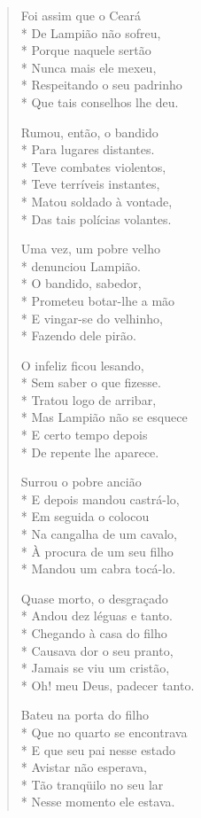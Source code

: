 \begin{verse}
Foi assim que o Ceará\\*
De Lampião não sofreu,\\*
Porque naquele sertão\\*
Nunca mais ele mexeu,\\*
Respeitando o seu padrinho\\*
Que tais conselhos lhe deu.

Rumou, então, o bandido\\*
Para lugares distantes.\\*
Teve combates violentos,\\*
Teve terríveis instantes,\\*
Matou soldado à vontade,\\*
Das tais polícias volantes.

Uma vez, um pobre velho\\*
denunciou Lampião.\\*
O bandido, sabedor,\\*
Prometeu botar-lhe a mão\\*
E vingar-se do velhinho,\\*
Fazendo dele pirão.

O infeliz ficou lesando,\\*
Sem saber o que fizesse.\\*
Tratou logo de arribar,\\*
Mas Lampião não se esquece\\*
E certo tempo depois\\*
De repente lhe aparece.

Surrou o pobre ancião\\*
E depois mandou castrá-lo,\\*
Em seguida o colocou\\*
Na cangalha de um cavalo,\\*
À procura de um seu filho\\*
Mandou um cabra tocá-lo.

Quase morto, o desgraçado\\*
Andou dez léguas e tanto.\\*
Chegando à casa do filho\\*
Causava dor o seu pranto,\\*
Jamais se viu um cristão,\\*
Oh! meu Deus, padecer tanto.

Bateu na porta do filho\\*
Que no quarto se encontrava\\*
E que seu pai nesse estado\\*
Avistar não esperava,\\*
Tão tranqüilo no seu lar\\*
Nesse momento ele estava.


\end{verse}
